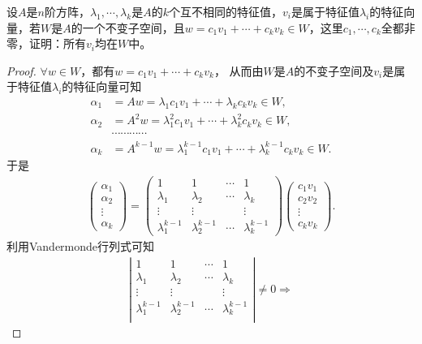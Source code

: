 \documentclass[../../main.tex]{subfiles}%
\begin{document}
\begin{example}
设$A$是$n$阶方阵，$\lambda_1,\cdots,\lambda_k$是$A$的$k$个互不相同的特征值，$v_i$是属于特征值$\lambda_i$的特征向量，若$W$是$A$的一个不变子空间，且$w = c_1v_1 + \cdots + c_kv_k\in W$，这里$c_1,\cdots,c_k$全都非零，证明：所有$v_i$均在$W$中。 
\end{example}
\begin{proof}

$\forall w\in W$，都有$w = c_1v_1 + \cdots + c_kv_k$，
从而由$W$是$A$的不变子空间及$v_i$是属于特征值$\lambda_i$的特征向量可知
\begin{align*}
\alpha_1 &= Aw = \lambda_1c_1v_1 + \cdots + \lambda_kc_kv_k\in W, \\
\alpha_2 &= A^2w = \lambda_1^2c_1v_1 + \cdots + \lambda_k^2c_kv_k\in W, \\
&\cdots \cdots \cdots \cdots \\
\alpha_k &= A^{k - 1}w = \lambda_1^{k - 1}c_1v_1 + \cdots + \lambda_k^{k - 1}c_kv_k\in W.
\end{align*}
于是
\begin{align*}
\begin{pmatrix}
\alpha_1 \\
\alpha_2 \\
\vdots \\
\alpha_k
\end{pmatrix} = 
\begin{pmatrix}
1 & 1 & \cdots & 1 \\
\lambda_1 & \lambda_2 & \cdots & \lambda_k \\
\vdots & \vdots & & \vdots \\
\lambda_1^{k - 1} & \lambda_2^{k - 1} & \cdots & \lambda_k^{k - 1}
\end{pmatrix}
\begin{pmatrix}
c_1v_1 \\
c_2v_2 \\
\vdots \\
c_kv_k
\end{pmatrix}.
\end{align*}
利用Vandermonde行列式可知
\begin{align*}
\left| \begin{matrix}
1&		1&		\cdots&		1\\
\lambda _1&		\lambda _2&		\cdots&		\lambda _k\\
\vdots&		\vdots&		&		\vdots\\
\lambda _{1}^{k-1}&		\lambda _{2}^{k-1}&		\cdots&		\lambda _{k}^{k-1}\\
\end{matrix} \right|\ne 0\Rightarrow 

\end{align*}
\end{proof}
\end{document}
